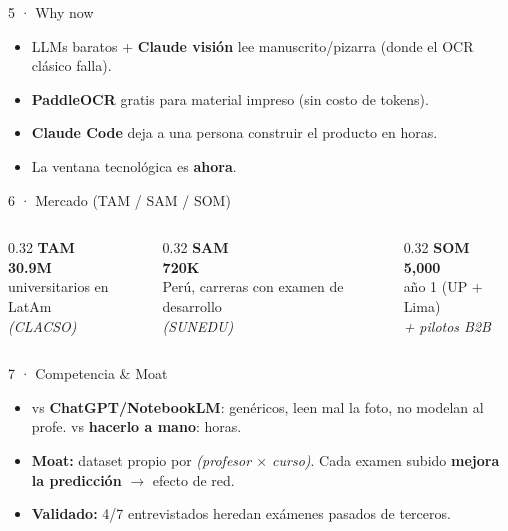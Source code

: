 \documentclass[aspectratio=169,11pt]{beamer}
\newcommand{\hi}[1]{\textcolor{amberdeep}{\textbf{#1}}}
\begin{document}
\begin{frame}{5 · Why now}
  \large
  \begin{itemize}
    \item LLMs baratos + \hi{Claude visión} lee manuscrito/pizarra (donde el OCR clásico falla).
    \item \hi{PaddleOCR} gratis para material impreso (sin costo de tokens).
    \item \hi{Claude Code} deja a una persona construir el producto en horas.
    \item La ventana tecnológica es \textbf{ahora}.
  \end{itemize}
\end{frame}

\begin{frame}{6 · Mercado (TAM / SAM / SOM)}
  \vspace{0.4em}
  \begin{columns}[T]
    \begin{column}{0.32\textwidth}\centering
      {\color{amber}\bfseries\Large TAM}\\[0.4em]
      {\fontsize{30}{34}\selectfont\bfseries 30.9M}\\[0.3em]
      universitarios en LatAm\\{\small\itshape (CLACSO)}
    \end{column}
    \begin{column}{0.32\textwidth}\centering
      {\color{amber}\bfseries\Large SAM}\\[0.4em]
      {\fontsize{30}{34}\selectfont\bfseries 720K}\\[0.3em]
      Perú, carreras con examen de desarrollo\\{\small\itshape (SUNEDU)}
    \end{column}
    \begin{column}{0.32\textwidth}\centering
      {\color{amber}\bfseries\Large SOM}\\[0.4em]
      {\fontsize{30}{34}\selectfont\bfseries 5,000}\\[0.3em]
      año 1 (UP + Lima)\\{\small\itshape + pilotos B2B}
    \end{column}
  \end{columns}
\end{frame}

\begin{frame}{7 · Competencia \& Moat}
  \large
  \begin{itemize}
    \item vs \textbf{ChatGPT/NotebookLM}: genéricos, leen mal la foto, no modelan al profe. vs \textbf{hacerlo a mano}: horas.
    \item \hi{Moat:} dataset propio por \emph{(profesor $\times$ curso)}. Cada examen subido \textbf{mejora la predicción} $\rightarrow$ efecto de red.
    \item \textbf{Validado:} 4/7 entrevistados heredan exámenes pasados de terceros.
  \end{itemize}
\end{frame}
\end{document}
